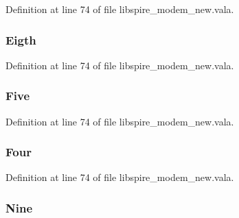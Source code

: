 Definition at line 74 of file libspire\-\_\-modem\-\_\-new.\-vala.

\hypertarget{libspire__modem__new_8vala_ac5a31d996f5dd33cf991970e41362b65}{
\subsubsection[{Eigth}]{\setlength{\rightskip}{0pt plus 5cm}Eigth}}\label{libspire__modem__new_8vala_ac5a31d996f5dd33cf991970e41362b65}


Definition at line 74 of file libspire\-\_\-modem\-\_\-new.\-vala.

\hypertarget{libspire__modem__new_8vala_aee61276f9005313515feb62138be2b8c}{
\subsubsection[{Five}]{\setlength{\rightskip}{0pt plus 5cm}Five}}\label{libspire__modem__new_8vala_aee61276f9005313515feb62138be2b8c}


Definition at line 74 of file libspire\-\_\-modem\-\_\-new.\-vala.

\hypertarget{libspire__modem__new_8vala_a3ffdf73f4d6c86cda4741740d081325c}{
\subsubsection[{Four}]{\setlength{\rightskip}{0pt plus 5cm}Four}}\label{libspire__modem__new_8vala_a3ffdf73f4d6c86cda4741740d081325c}


Definition at line 74 of file libspire\-\_\-modem\-\_\-new.\-vala.

\hypertarget{libspire__modem__new_8vala_abd916c08d176f7a521336059e38f4b25}{
\subsubsection[{Nine}]{\setlength{\rightskip}{0pt plus 5cm}Nine}}\label{libspire__modem__new_8vala_abd916c08d176f7a521336059e38f4b25}


